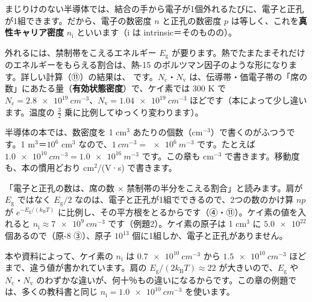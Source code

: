 
\label{ph:原-9:sec3}
まじりけのない半導体では、結合の手から電子が1個外れるたびに、電子と正孔が1組できます。だから、電子の数密度 $n$ と正孔の数密度 $p$ は等しく、これを\textbf{真性キャリア密度} $n_{\mathrm i}$ といいます（i は intrinsic＝そのものの）。

外れるには、禁制帯をこえるエネルギー $E_{\mathrm g}$ が要ります。熱でたまたまそれだけのエネルギーをもらえる割合は、熱-15 のボルツマン因子のような形になります。詳しい計算（⑪）の結果は、
\label{ph:原-9:ni}です。$N_{\mathrm c}$・$N_{\mathrm v}$ は、伝導帯・価電子帯の「席の数」にあたる量（\textbf{有効状態密度}）で、ケイ素では 300 K で $N_{\mathrm c}=\qty{2.8e19}{cm^{-3}}$、$N_{\mathrm v}=\qty{1.04e19}{cm^{-3}}$ ほどです（本によって少し違います。温度の $\tfrac32$ 乗に比例してゆっくり変わります）。

半導体の本では、数密度を 1 cm$^3$ あたりの個数（cm$^{-3}$）で書くのがふつうです。1 m$^3$＝$10^6$ cm$^3$ なので、$\qty{1}{cm^{-3}}=\qty{e6}{m^{-3}}$ です。たとえば $\qty{1.0e10}{cm^{-3}}=\qty{1.0e16}{m^{-3}}$ です。この章も cm$^{-3}$ で書きます。移動度も、本の慣用どおり cm$^2$/(V·s) で書きます。

\begin{phyomi}[$n_{\mathrm i}=\sqrt{N_{\mathrm c}N_{\mathrm v}}\,e^{-E_{\mathrm g}/(2k_{\mathrm B}T)}$]
「電子と正孔の数は、席の数 × 禁制帯の半分をこえる割合」と読みます。肩が $E_{\mathrm g}$ ではなく $E_{\mathrm g}/2$ なのは、電子と正孔が1組でできるので、2つの数のかけ算 $np$ が $e^{-E_{\mathrm g}/(k_{\mathrm B}T)}$ に比例し、その平方根をとるからです（④・⑪）。ケイ素の値を入れると $n_{\mathrm i}\approx\qty{7e9}{cm^{-3}}$ です（例題2）。ケイ素の原子は 1 cm$^3$ に $\num{5.0e22}$ 個あるので（原-8 ③）、原子 $10^{13}$ 個に1組しか、電子と正孔がありません。
\end{phyomi}

\noindent 本や資料によって、ケイ素の $n_{\mathrm i}$ は $\qty{0.7e10}{cm^{-3}}$ から $\qty{1.5e10}{cm^{-3}}$ ほどまで、違う値が書かれています。肩の $E_{\mathrm g}/(2k_{\mathrm B}T)\approx22$ が大きいので、$E_{\mathrm g}$ や $N_{\mathrm c}$・$N_{\mathrm v}$ のわずかな違いが、何十％もの違いになるからです。この章の例題では、多くの教科書と同じ $n_{\mathrm i}=\qty{1.0e10}{cm^{-3}}$ を使います。

